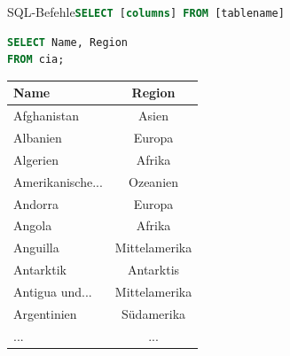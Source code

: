 \begin{frame}[fragile]{SQL-Befehle}{\lstinline[language=SQL]|SELECT [columns] FROM [tablename]|}
  \begin{lstlisting}[language=SQL, basicstyle=\ttfamily\scriptsize]
SELECT Name, Region
FROM cia;
\end{lstlisting}

  \begin{table}
    \centering
    \tiny
    \begin{tabular}{lc}
      \toprule
      \textbf{Name}    & \textbf{Region} \\
      \midrule
      Afghanistan      & Asien           \\
      Albanien         & Europa          \\
      Algerien         & Afrika          \\
      Amerikanische... & Ozeanien        \\
      Andorra          & Europa          \\
      Angola           & Afrika          \\
      Anguilla         & Mittelamerika   \\
      Antarktik        & Antarktis       \\
      Antigua und...   & Mittelamerika   \\
      Argentinien      & Südamerika      \\
      \midrule
      ...              & ...             \\
      \bottomrule
    \end{tabular}
  \end{table}
\end{frame}

